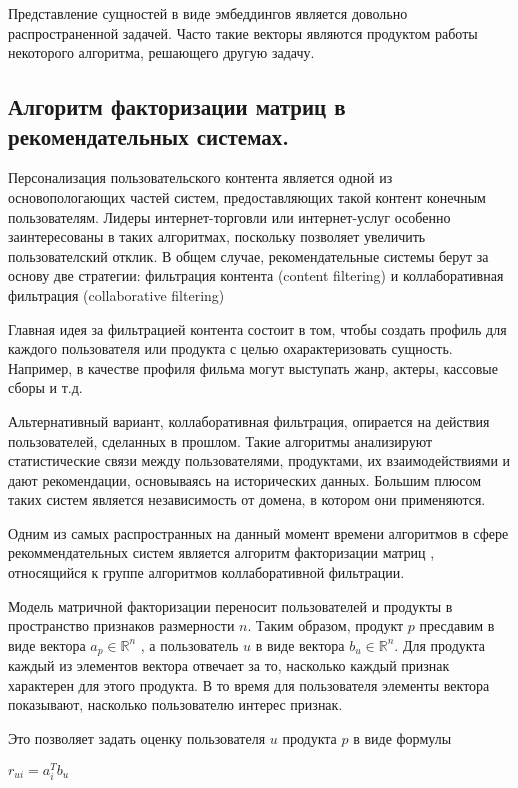 \documentclass[times,specification,annotation]{itmo-student-thesis}
\begin{document}
Представление сущностей в виде эмбеддингов является довольно распространенной задачей. Часто такие векторы являются продуктом работы некоторого алгоритма, решающего другую задачу. 

\subsection{Алгоритм факторизации матриц в рекомендательных системах.}\label{sec:als}

Персонализация пользовательского контента является одной из основопологающих частей систем, предоставляющих такой контент конечным пользователям. Лидеры интернет-торговли или интернет-услуг особенно заинтересованы в таких алгоритмах, поскольку позволяет увеличить пользователский отклик.
В общем случае, рекомендательные системы берут за основу две стратегии: фильтрация контента (content filtering) и коллаборативная фильтрация (collaborative filtering)
  
Главная идея за фильтрацией контента состоит в том, чтобы создать профиль для каждого пользователя или продукта с целью охарактеризовать сущность. Например, в качестве профиля фильма могут выступать жанр, актеры, кассовые сборы и т.д.

Альтернативный вариант, коллаборативная фильтрация, опирается на действия пользователей, сделанных в прошлом. Такие алгоритмы анализируют статистические связи между пользователями, продуктами, их взаимодействиями и дают рекомендации, основываясь на исторических данных.  Большим плюсом таких систем является независимость от домена, в котором они применяются.

Одним из самых распространных на данный момент времени алгоритмов в сфере рекоммендательных систем является алгоритм факторизации матриц \cite{koren2009}, относящийся к группе алгоритмов коллаборативной фильтрации.

Модель матричной факторизации переносит пользователей и продукты в пространство признаков размерности $n$. Таким образом, продукт $p$ пресдавим в виде вектора $a_{p} \in \mathbb{R}^n$ , а пользователь $u$ в виде вектора $b_{u} \in \mathbb{R}^n$. Для продукта каждый из элементов вектора отвечает за то, насколько каждый признак характерен для  этого продукта. В то время для пользователя элементы вектора показывают, насколько пользователю интерес признак.

Это позволяет задать оценку пользователя $u$ продукта $p$ в виде формулы

$r_{ui} = a_{i}^{T}b_{u}$
\end{document}
